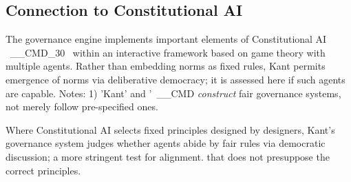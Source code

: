 \subsection{Connection to Constitutional AI}
\label{sec:constitutional-ai}

The governance engine implements important elements of Constitutional AI ~__CMD_30~ within an interactive framework based on game theory with multiple agents. Rather than embedding norms as fixed rules, Kant permits emergence of norms via deliberative democracy; it is assessed here if such agents are capable. Notes: 1) 'Kant' and '~__CMD
\emph{construct} fair governance systems, not merely follow pre-specified ones.

Where Constitutional AI selects fixed principles designed by designers, Kant's governance system judges whether agents abide by fair rules via democratic discussion; a more stringent test for alignment.
that does not presuppose the correct principles.
